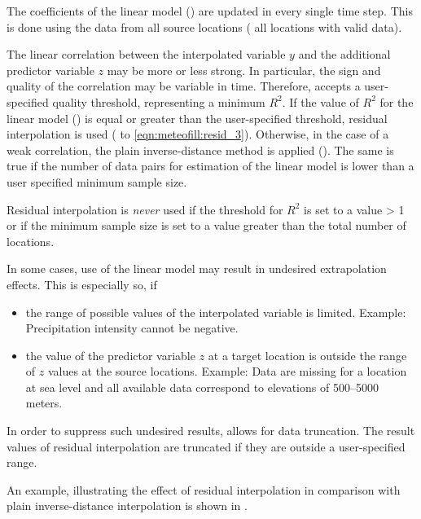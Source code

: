 The coefficients of the linear model () are updated in every single time step. This is done using the data from all source locations (\ie{} all locations with valid data).

The linear correlation between the interpolated variable $y$ and the additional predictor variable $z$ may be more or less strong. In particular, the sign and quality of the correlation may be variable in time. Therefore,  accepts a user-specified quality threshold, representing a minimum $R^2$. If the value of $R^2$ for the linear model () is equal or greater than the user-specified threshold, residual interpolation is used ( to \ref{eqn:meteofill:resid_3}). Otherwise, in the case of a weak correlation, the plain inverse-distance method is applied (). The same is true if the number of data pairs for estimation of the linear model is lower than a user specified minimum sample size.

Residual interpolation is \emph{never} used if the threshold for $R^2$ is set to a value > 1 or if the minimum sample size is set to a value greater than the total number of locations.

In some cases, use of the linear model may result in undesired extrapolation effects. This is especially so, if
\begin{itemize}
  \item the range of possible values of the interpolated variable is limited. Example: Precipitation intensity cannot be negative.
  \item the value of the predictor variable $z$ at a target location is outside the range of $z$ values at the source locations. Example: Data are missing for a location at sea level and all available data correspond to elevations of 500--5000 meters.
\end{itemize}

In order to suppress such undesired results,  allows for data truncation. The result values of residual interpolation are truncated if they are outside a user-specified range.

An example, illustrating the effect of residual interpolation in comparison with plain inverse-distance interpolation is shown in .

